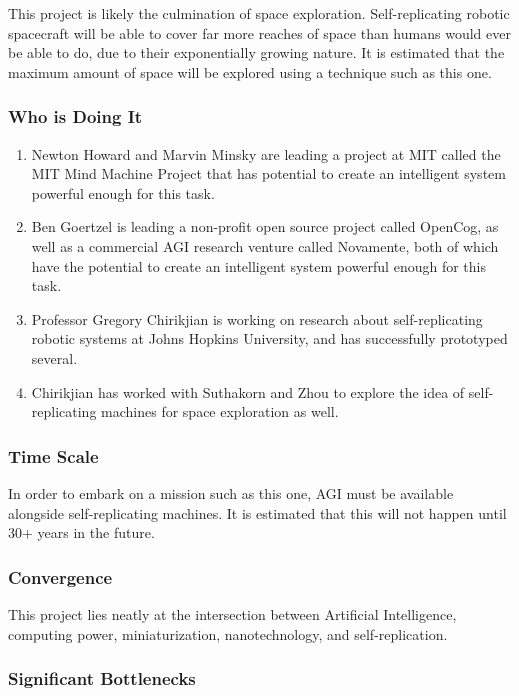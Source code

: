 \documentclass[english]{article}
\begin{document}
This project is likely the culmination of space exploration. Self-replicating
robotic spacecraft will be able to cover far more reaches of space
than humans would ever be able to do, due to their exponentially growing
nature. It is estimated that the maximum amount of space will be explored
using a technique such as this one.


\subsubsection{Who is Doing It}

\begin{enumerate}
\item Newton Howard and Marvin Minsky are leading a project at MIT called
the MIT Mind Machine Project that has potential to create an intelligent
system powerful enough for this task\cite{mmp}.
\item Ben Goertzel is leading a non-profit open source project called OpenCog,
as well as a commercial AGI research venture called Novamente, both
of which have the potential to create an intelligent system powerful
enough for this task\cite{goertzel}.
\item Professor Gregory Chirikjian is working on research about self-replicating
robotic systems at Johns Hopkins University, and has successfully
prototyped several\cite{chirikjian}.
\item Chirikjian has worked with Suthakorn and Zhou to explore the idea
of self-replicating machines for space exploration as well\cite{chirikjian2}.
\end{enumerate}

\subsubsection{Time Scale}

In order to embark on a mission such as this one, AGI must be available
alongside self-replicating machines. It is estimated that this will
not happen until 30+ years in the future.


\subsubsection{Convergence}

This project lies neatly at the intersection between Artificial Intelligence,
computing power, miniaturization, nanotechnology, and self-replication. 


\subsubsection{Significant Bottlenecks}
\end{document}

